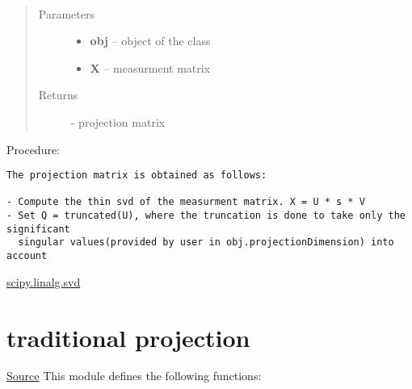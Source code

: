 \documentclass[letterpaper,10pt,english]{sphinxmanual}
\begin{document}

\begin{fulllineitems}
\label{index:brake.solve.projection.obtain_projection_matrix}~\begin{quote}\begin{description}
\item[{Parameters}] \leavevmode\begin{itemize}
\item {} 
\textbf{obj} -- object of the class 

\item {} 
\textbf{X} -- measurment matrix

\end{itemize}

\item[{Returns}] \leavevmode
{} - projection matrix

\end{description}\end{quote}

Procedure:

\begin{Verbatim}[commandchars=\\\{\}]
The projection matrix is obtained as follows:

- Compute the thin svd of the measurment matrix. X = U * s * V
- Set Q = truncated(U), where the truncation is done to take only the significant 
  singular values(provided by user in obj.projectionDimension) into account
\end{Verbatim}

\end{fulllineitems}





\href{http://docs.scipy.org/doc/scipy-0.14.0/reference/generated/scipy.linalg.svd.html}{scipy.linalg.svd}




\section{traditional projection}
\label{index:traditional-projection}
\href{https://bitbucket.org/akadar/brakesqueal0.1/src/master/brake/solve/traditionalProjection.py?at=master}{Source}
\label{index:module-brake.solve.traditionalProjection}
This module defines the following functions:
\end{document}
